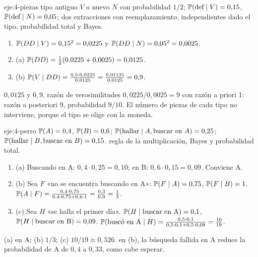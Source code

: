 \begin{solucion}{eje:4-piezas}
\datos tipo antiguo $V$ o nuevo $N$ con probabilidad $1/2$; $\mathbb{P}(\text{def}\mid V)=0{,}15$, $\mathbb{P}(\text{def}\mid N)=0{,}05$; dos extracciones con reemplazamiento, independientes dado el tipo.
\planteamiento probabilidad total y Bayes.
\pasos
\begin{enumerate}[label=\arabic*.]
  \item $\mathbb{P}(DD\mid V)=0{,}15^{2}=0{,}0225$ y $\mathbb{P}(DD\mid N)=0{,}05^{2}=0{,}0025$.
  \item (a) $\mathbb{P}(DD)=\frac12(0{,}0225+0{,}0025)=0{,}0125$.
  \item (b) $\mathbb{P}(V\mid DD)=\frac{0{,}5\cdot0{,}0225}{0{,}0125}=\frac{0{,}01125}{0{,}0125}=0{,}9$.
\end{enumerate}
\resultado $0{,}0125$ y $0{,}9$.
\comprobacion razón de verosimilitudes $0{,}0225/0{,}0025=9$ con razón a priori 1: razón a posteriori 9, probabilidad $9/10$. El número de piezas de cada tipo no interviene, porque el tipo se elige con la moneda.
\end{solucion}

\begin{solucion}{eje:4-perro}
\datos $\mathbb{P}(A)=0{,}4$, $\mathbb{P}(B)=0{,}6$; $\mathbb{P}(\text{hallar}\mid A,\text{buscar en }A)=0{,}25$; $\mathbb{P}(\text{hallar}\mid B,\text{buscar en }B)=0{,}15$.
\planteamiento regla de la multiplicación, Bayes y probabilidad total.
\pasos
\begin{enumerate}[label=\arabic*.]
  \item (a) Buscando en A: $0{,}4\cdot0{,}25=0{,}10$; en B: $0{,}6\cdot0{,}15=0{,}09$. Conviene A.
  \item (b) Sea $F$ «no se encuentra buscando en A»: $\mathbb{P}(F\mid A)=0{,}75$, $\mathbb{P}(F\mid B)=1$. $\mathbb{P}(A\mid F)=\frac{0{,}4\cdot0{,}75}{0{,}4\cdot0{,}75+0{,}6\cdot1}=\frac{0{,}3}{0{,}9}=\frac13$.
  \item (c) Sea $H$ «se halla el primer día». $\mathbb{P}(H\mid\text{buscar en A})=0{,}1$, $\mathbb{P}(H\mid\text{buscar en B})=0{,}09$. $\mathbb{P}(\text{buscó en A}\mid H)=\frac{0{,}5\cdot0{,}1}{0{,}5\cdot0{,}1+0{,}5\cdot0{,}09}=\frac{10}{19}$.
\end{enumerate}
\resultado (a) en A; (b) $1/3$; (c) $10/19\approx0{,}526$.
\comprobacion en (b), la búsqueda fallida en A reduce la probabilidad de A de $0{,}4$ a $0{,}33$, como cabe esperar.
\end{solucion}

